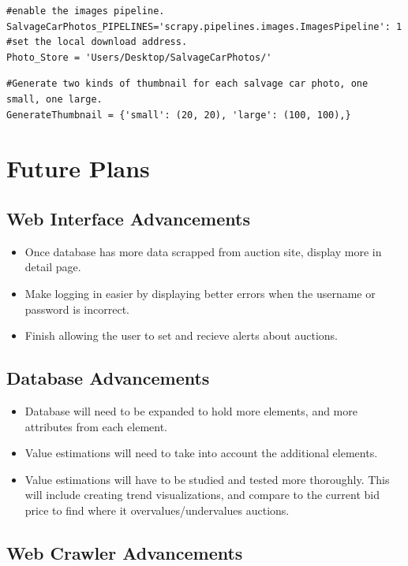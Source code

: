 \documentclass[onecolumn, draftclsnofoot,10pt, compsoc]{IEEEtran}
\begin{document}
\begin{verbatim}
#enable the images pipeline.
SalvageCarPhotos_PIPELINES='scrapy.pipelines.images.ImagesPipeline': 1
#set the local download address.
Photo_Store = 'Users/Desktop/SalvageCarPhotos/'
\end{verbatim}

\begin{verbatim}
#Generate two kinds of thumbnail for each salvage car photo, one small, one large.
GenerateThumbnail = {'small': (20, 20), 'large': (100, 100),}

\end{verbatim}


\section{Future Plans}
\subsection{Web Interface Advancements}
\begin{itemize}
    \item Once database has more data scrapped from auction site, display more in detail page.
    \item Make logging in easier by displaying better errors when the username or password is incorrect.
    \item Finish allowing the user to set and recieve alerts about auctions.
\end{itemize}

\subsection{Database Advancements}
\begin{itemize}
    \item Database will need to be expanded to hold more elements, and more attributes from each element. 
    \item Value estimations will need to take into account the additional elements. 
    \item Value estimations will have to be studied and tested more thoroughly. This will include creating trend visualizations, and compare to the current bid price to find where it overvalues/undervalues auctions. 
    
\end{itemize}

\subsection{Web Crawler Advancements}
\end{document}
